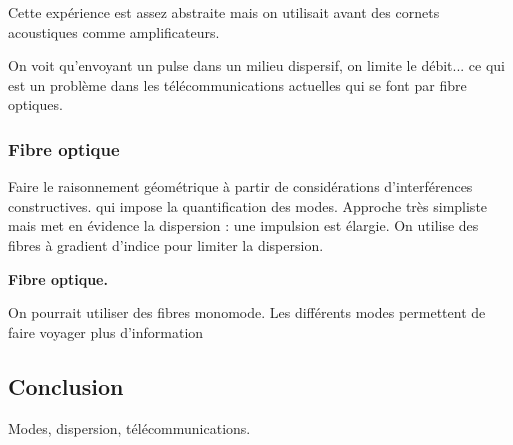 Cette expérience est assez abstraite mais on utilisait avant des cornets acoustiques comme amplificateurs.

\begin{transition}
On voit qu'envoyant un pulse dans un milieu dispersif, on limite le débit... ce qui est un problème dans les télécommunications actuelles qui se font par fibre optiques. 
\end{transition}

\subsubsection{Fibre optique}

Faire le raisonnement géométrique à partir de considérations d'interférences constructives. qui impose la quantification des modes.
Approche très simpliste mais met en évidence la dispersion : une impulsion est élargie.
On utilise des fibres à gradient d'indice pour limiter la dispersion.

\begin{slide}
\textbf{Fibre optique.}
\end{slide}

On pourrait utiliser des fibres monomode.
Les différents modes permettent de faire voyager plus d'information

\subsection*{Conclusion}

Modes, dispersion, télécommunications.

\newpage